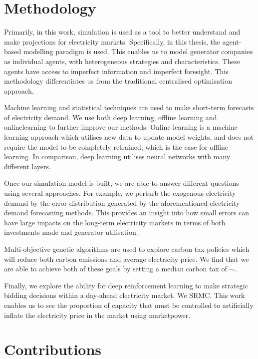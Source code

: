 \section{Methodology}

Primarily, in this work, simulation is used as a tool to better understand and make projections for electricity markets. Specifically, in this thesis, the agent-based modelling paradigm is used. This enables us to model generator companies as individual agents, with heterogeneous strategies and characteristics. These agents have access to imperfect information and imperfect foresight. This methodology differentiates us from the traditional centralised optimisation approach.

Machine learning and statistical techniques are used to make short-term forecasts of electricity demand. We use both deep learning, offline learning and \gls{onlinelearning} to further improve our methods. Online learning is a machine learning approach which utilises new data to update model weights, and does not require the model to be completely retrained, which is the case for offline learning. In comparison, deep learning utilises neural networks with many different layers. 

Once our simulation model is built, we are able to answer different questions using several approaches. For example, we perturb the exogenous electricity demand by the error distribution generated by the aforementioned electricity demand forecasting methods. This provides an insight into how small errors can have large impacts on the long-term electricity markets in terms of both investments made and generator utilisation.

Multi-objective genetic algorithms are used to explore carbon tax policies which will reduce both carbon emissions and average electricity price. We find that we are able to achieve both of these goals by setting a median carbon tax of ${\sim}$.

Finally, we explore the ability for deep reinforcement learning to make strategic bidding decisions within a day-ahead electricity market. We \gls{SRMC}. This work enables us to see the proportion of capacity that must be controlled to artificially inflate the electricity price in the market using \gls{marketpower}. 

\section{Contributions}

